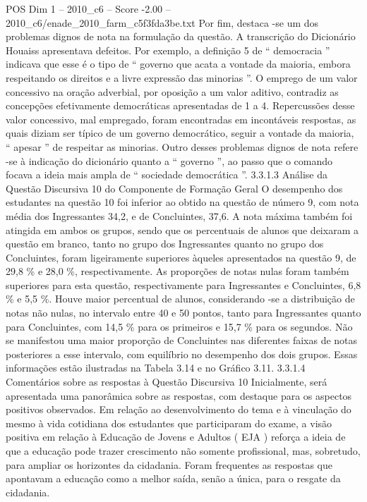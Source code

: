 \begin{textsample}{POS Dim 1 – 2010\_c6 – Score -2.00 – 2010\_c6/enade\_2010\_farm\_c5f3fda3be.txt}
Por fim, destaca -se um dos problemas dignos de nota na formulação da questão.
A transcrição do Dicionário Houaiss apresentava defeitos.
Por exemplo, a definição 5 de “ democracia ” indicava que esse é o tipo de “ governo que acata a vontade da maioria, embora respeitando os direitos e a livre expressão das minorias ”.
O emprego de um valor concessivo na oração adverbial, por oposição a um valor aditivo, contradiz as concepções efetivamente democráticas apresentadas de 1 a 4.
Repercussões desse valor concessivo, mal empregado, foram encontradas em incontáveis respostas, as quais diziam ser típico de um governo democrático, seguir a vontade da maioria, “ apesar ” de respeitar as minorias.
Outro desses problemas dignos de nota refere -se à indicação do dicionário quanto a “ governo ”, ao passo que o comando focava a ideia mais ampla de “ sociedade democrática ”. 3.3.1.3 Análise da Questão Discursiva 10 do Componente de Formação Geral O desempenho dos estudantes na questão 10 foi inferior ao obtido na questão de número 9, com nota média dos Ingressantes 34,2, e de Concluintes, 37,6.
A nota máxima também foi atingida em ambos os grupos, sendo que os percentuais de alunos que deixaram a questão em branco, tanto no grupo dos Ingressantes quanto no grupo dos Concluintes, foram ligeiramente superiores àqueles apresentados na questão 9, de 29,8 \% e 28,0 \%, respectivamente.
As proporções de notas nulas foram também superiores para esta questão, respectivamente para Ingressantes e Concluintes, 6,8 \% e 5,5 \%.
Houve maior percentual de alunos, considerando -se a distribuição de notas não nulas, no intervalo entre 40 e 50 pontos, tanto para Ingressantes quanto para Concluintes, com 14,5 \% para os primeiros e 15,7 \% para os segundos.
Não se manifestou uma maior proporção de Concluintes nas diferentes faixas de notas posteriores a esse intervalo, com equilíbrio no desempenho dos dois grupos.
Essas informações estão ilustradas na Tabela 3.14 e no Gráfico 3.11. 3.3.1.4 Comentários sobre as respostas à Questão Discursiva 10 Inicialmente, será apresentada uma panorâmica sobre as respostas, com destaque para os aspectos positivos observados.
Em relação ao desenvolvimento do tema e à vinculação do mesmo à vida cotidiana dos estudantes que participaram do exame, a visão positiva em relação à Educação de Jovens e Adultos ( EJA ) reforça a ideia de que a educação pode trazer crescimento não somente profissional, mas, sobretudo, para ampliar os horizontes da cidadania.
Foram frequentes as respostas que apontavam a educação como a melhor saída, senão a única, para o resgate da cidadania.

\end{textsample}
